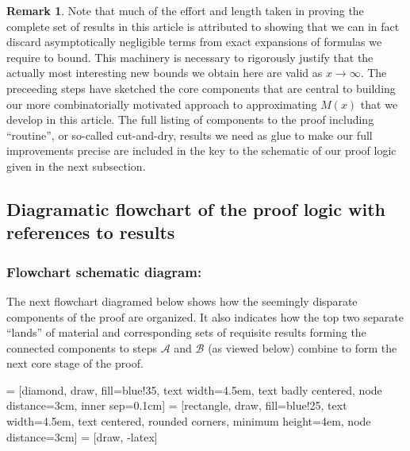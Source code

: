 \documentclass[11pt,reqno,a4letter]{article}
\numberwithin{figure}{section}
\numberwithin{table}{section}
\theoremstyle{plain}
\numberwithin{theorem}{section}
\theoremstyle{definition}
\newtheorem{remark}[theorem]{Remark}
\begin{document}
\begin{remark}
Note that much of the effort and length taken in proving the complete set of results in this article is 
attributed to showing that we can in fact discard asymptotically negligible terms from exact expansions  
of formulas we require to bound. This machinery is necessary to rigorously justify that the actually most 
interesting new bounds we obtain here are valid as $x \rightarrow \infty$. The preceeding steps have sketched 
the core components that are central to building our more combinatorially motivated approach to approximating 
$M(x)$ that we develop in this article. The full listing of components to the proof including 
``routine'', or so-called cut-and-dry, results we need as glue 
to make our full improvements precise are included in the key to the schematic of our proof logic given in the next 
subsection.
\end{remark} 

\subsection{Diagramatic flowchart of the proof logic with references to results} 

\subsubsection*{Flowchart schematic diagram: } 

The next flowchart diagramed below shows how the seemingly disparate components of the proof are organized. 
It also indicates how the top two separate ``lands'' of material and corresponding sets of requisite results 
forming the connected components to steps $\mathcal{A}$ and $\mathcal{B}$ (as viewed below) 
combine to form the next core stage of the proof. 

 = [diamond, draw, fill=blue!35, text width=4.5em, text badly centered, 
                             node distance=3cm, inner sep=0.1cm]
 = [rectangle, draw, fill=blue!25, text width=4.5em, text centered, 
                            rounded corners, minimum height=4em, node distance=3cm]
 = [draw, -latex]
\end{document}
